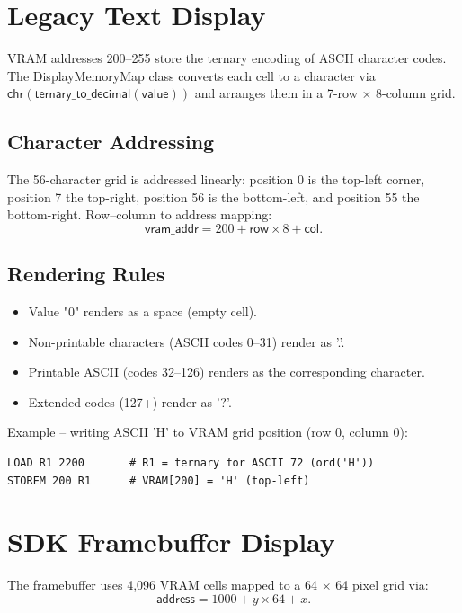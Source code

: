 \documentclass[12pt,a4paper,twoside]{book}
\theoremstyle{trinarytheorem}
\theoremstyle{trinarydefinition}
\newcommand{\code}[1]{\textsf{#1}}
\begin{document}
\section{Legacy Text Display}

VRAM addresses 200--255 store the ternary encoding of ASCII character codes. The
\code{DisplayMemoryMap} class converts each cell to a character via
$\code{chr}(\code{ternary\_to\_decimal}(\code{value}))$ and arranges them
in a 7-row $\times$ 8-column grid.

\subsection{Character Addressing}

The 56-character grid is addressed linearly: position 0 is the top-left corner,
position 7 the top-right, position 56 is the bottom-left, and position 55 the
bottom-right. Row--column to address mapping:
\[
\code{vram\_addr} = 200 + \code{row} \times 8 + \code{col}.
\]

\subsection{Rendering Rules}

\begin{itemize}
    \item Value \code{"0"} renders as a space (empty cell).
    \item Non-printable characters (ASCII codes 0--31) render as \code{'.'}.
    \item Printable ASCII (codes 32--126) renders as the corresponding character.
    \item Extended codes (127+) render as \code{'?'}.
\end{itemize}

Example -- writing ASCII 'H' to VRAM grid position (row 0, column 0):
\begin{lstlisting}
LOAD R1 2200       # R1 = ternary for ASCII 72 (ord('H'))
STOREM 200 R1      # VRAM[200] = 'H' (top-left)
\end{lstlisting}

\section{SDK Framebuffer Display}

The framebuffer uses 4,096 VRAM cells mapped to a 64 $\times$ 64 pixel grid via:
\[
\code{address} = 1000 + y \times 64 + x.
\]
\end{document}
